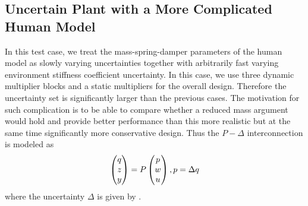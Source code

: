 \let\designtwodataone\empty
\let\designtwodatadtwo\empty


\subsection{Uncertain Plant with a More Complicated Human Model}

In this test case, we treat the mass-spring-damper parameters of the human model as slowly varying uncertainties 
together with arbitrarily fast varying environment stiffness coefficient uncertainty. In this case, we use three
dynamic multiplier blocks and a static multipliers for the overall design. Therefore the uncertainty set is 
significantly larger than the previous cases. The motivation for such complication is to be able to compare 
whether a reduced mass argument would hold and provide better performance than this more realistic but at 
the same time significantly more conservative design. Thus the $P-\Delta$ interconnection is modeled as 
\[
\begin{pmatrix}q\\z\\y\end{pmatrix}= P \begin{pmatrix}p\\w\\u\end{pmatrix}, p=\Delta q
\]
where the uncertainty $\Delta$ is given by . 

